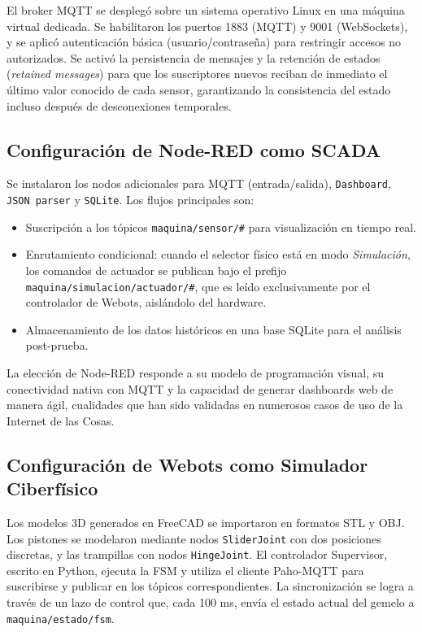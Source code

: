 El broker MQTT se desplegó sobre un sistema operativo Linux en una máquina virtual dedicada. Se habilitaron los puertos 1883 (MQTT) y 9001 (WebSockets), y se aplicó autenticación básica (usuario/contraseña) para restringir accesos no autorizados. Se activó la persistencia de mensajes y la retención de estados (\textit{retained messages}) para que los suscriptores nuevos reciban de inmediato el último valor conocido de cada sensor, garantizando la consistencia del estado incluso después de desconexiones temporales.

\subsection{Configuración de Node-RED como SCADA}

Se instalaron los nodos adicionales para MQTT (entrada/salida), \texttt{Dashboard}, \texttt{JSON parser} y \texttt{SQLite}. Los flujos principales son:
\begin{itemize}
    \item Suscripción a los tópicos \texttt{maquina/sensor/\#} para visualización en tiempo real.
    \item Enrutamiento condicional: cuando el selector físico está en modo \textit{Simulación}, los comandos de actuador se publican bajo el prefijo \texttt{maquina/simulacion/actuador/\#}, que es leído exclusivamente por el controlador de Webots, aislándolo del hardware.
    \item Almacenamiento de los datos históricos en una base SQLite para el análisis post-prueba.
\end{itemize}

La elección de Node-RED responde a su modelo de programación visual, su conectividad nativa con MQTT y la capacidad de generar dashboards web de manera ágil, cualidades que han sido validadas en numerosos casos de uso de la Internet de las Cosas.

\subsection{Configuración de Webots como Simulador Ciberfísico}

Los modelos 3D generados en FreeCAD se importaron en formatos STL y OBJ. Los pistones se modelaron mediante nodos \texttt{SliderJoint} con dos posiciones discretas, y las trampillas con nodos \texttt{HingeJoint}. El controlador Supervisor, escrito en Python, ejecuta la FSM y utiliza el cliente Paho-MQTT para suscribirse y publicar en los tópicos correspondientes. La sincronización se logra a través de un lazo de control que, cada 100 ms, envía el estado actual del gemelo a \texttt{maquina/estado/fsm}.

